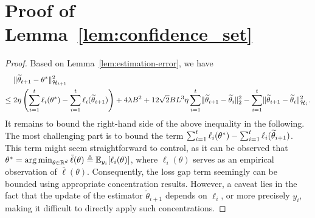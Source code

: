 \section{Proof of Lemma~\ref{lem:confidence_set}}
\begin{proof}
    Based on Lemma~\ref{lem:estimation-error}, we have  
    \begin{align*}
        {}&\lVert\widetilde{\theta}_{t+1} - \theta^*\rVert_{\mathcal{H}_{t+1}}^2 \\
        \leq {}& 2 \eta \left(\sum_{i=1}^t \ell_{i}(\theta^*) - \sum_{i=1}^t \ell_{i}(\widetilde{\theta}_{i+1}) \right) + 4 \lambda B^2                                    + 12 \sqrt{2} B L^3 \eta \sum_{i=1}^t \lVert\widetilde{\theta}_{i+1} - \widetilde{\theta}_{i}\rVert_2^2 - \sum_{i=1}^t \lVert\widetilde{\theta}_{i+1} - \widetilde{\theta}_{i}\rVert_{\mathcal{H}_{i}}^2.
    \end{align*}
    It remains to bound the right-hand side of the above inequality in the following. The most challenging part is to bound the term $\sum_{i=1}^t \ell_{i}(\theta^*) - \sum_{i=1}^t \ell_{i}(\widetilde{\theta}_{i+1})$. This term might seem straightforward to control, as it can be observed that $\theta^* = \operatorname*{arg\,min}_{\theta \in \mathbb{R}^d} \bar{\ell}(\theta) \triangleq \mathbb{E}_{y_{i}}[\ell_{i}(\theta)]$, where $\ell_{i}(\theta)$ serves as an empirical observation of $\bar{\ell}(\theta)$. Consequently, the loss gap term seemingly can be bounded using appropriate concentration results. However, a caveat lies in the fact that the update of the estimator $\tilde{\theta}_{i+1}$ depends on $\ell_{i}$, or more precisely $y_{i}$, making it difficult to directly apply such concentrations.  


\end{proof}
